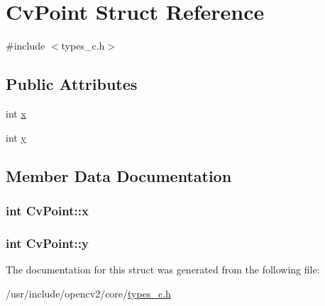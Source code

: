 \hypertarget{structCvPoint}{\section{Cv\-Point Struct Reference}
\label{structCvPoint}
}


{\ttfamily \#include $<$types\-\_\-c.\-h$>$}

\subsection*{Public Attributes}
\begin{DoxyCompactItemize}
\item 
int \hyperlink{structCvPoint_ae7d5caa428c4bcff450a49bea1ea2333}{x}
\item 
int \hyperlink{structCvPoint_ac8acb40c59ac618353b5eac9c8583f3d}{y}
\end{DoxyCompactItemize}


\subsection{Member Data Documentation}
\hypertarget{structCvPoint_ae7d5caa428c4bcff450a49bea1ea2333}{
\subsubsection[{x}]{\setlength{\rightskip}{0pt plus 5cm}int Cv\-Point\-::x}}\label{structCvPoint_ae7d5caa428c4bcff450a49bea1ea2333}
\hypertarget{structCvPoint_ac8acb40c59ac618353b5eac9c8583f3d}{
\subsubsection[{y}]{\setlength{\rightskip}{0pt plus 5cm}int Cv\-Point\-::y}}\label{structCvPoint_ac8acb40c59ac618353b5eac9c8583f3d}


The documentation for this struct was generated from the following file\-:\begin{DoxyCompactItemize}
\item 
/usr/include/opencv2/core/\hyperlink{core_2types__c_8h}{types\-\_\-c.\-h}\end{DoxyCompactItemize}
